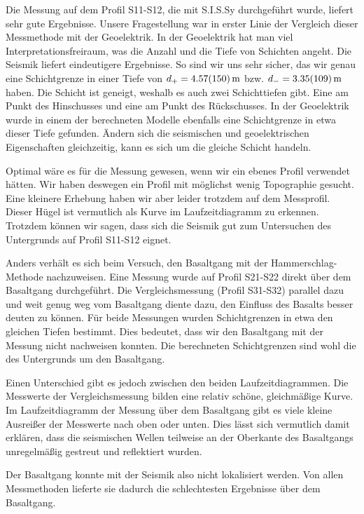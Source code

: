 \label{chap:zusfas}
Die Messung auf dem Profil S11-S12, die mit S.I.S.Sy durchgeführt wurde, liefert sehr gute Ergebnisse.
Unsere Fragestellung war in erster Linie der Vergleich dieser Messmethode mit der Geoelektrik. 
In der Geoelektrik hat man viel Interpretationsfreiraum, was die Anzahl und die Tiefe von Schichten angeht.
Die Seismik liefert eindeutigere Ergebnisse. So sind wir uns sehr sicher, das wir genau eine Schichtgrenze in einer Tiefe von $d_+= \SI{4,57 \pm 1,50}{m}$
bzw. $d_-= \SI{3,35 \pm 1,09}{m}$ haben. Die Schicht ist geneigt, weshalb es auch zwei Schichttiefen gibt. Eine am Punkt des Hinschusses und eine am Punkt des Rückschusses. In der Geoelektrik wurde in einem der berechneten Modelle ebenfalls eine Schichtgrenze in etwa dieser Tiefe gefunden. 
Ändern sich die seismischen und geoelektrischen Eigenschaften gleichzeitig, kann es sich um die gleiche Schicht handeln.

Optimal wäre es für die Messung gewesen, wenn wir ein ebenes Profil verwendet hätten. Wir haben deswegen ein Profil mit möglichst wenig Topographie gesucht.
Eine kleinere Erhebung haben wir aber leider trotzdem auf dem Messprofil. Dieser Hügel ist vermutlich als Kurve im Laufzeitdiagramm zu erkennen.
Trotzdem können wir sagen, dass sich die Seismik gut zum Untersuchen des Untergrunds auf Profil S11-S12 eignet.

Anders verhält es sich beim Versuch, den Basaltgang mit der Hammerschlag-Methode nachzuweisen. 
Eine Messung wurde auf Profil S21-S22 direkt über dem Basaltgang durchgeführt. Die Vergleichsmessung (Profil S31-S32) parallel dazu und weit genug weg vom Basaltgang diente dazu, den Einfluss des Basalts besser deuten zu können.
Für beide Messungen wurden Schichtgrenzen in etwa den gleichen Tiefen bestimmt. Dies bedeutet, dass wir den Basaltgang mit der Messung nicht nachweisen konnten. 
Die berechneten Schichtgrenzen sind wohl die des Untergrunds um den Basaltgang.

\newpage
Einen Unterschied gibt es jedoch zwischen den beiden Laufzeitdiagrammen. Die Messwerte der Vergleichsmessung bilden eine relativ schöne, gleichmäßige Kurve. 
Im Laufzeitdiagramm der Messung über dem Basaltgang gibt es viele kleine Ausreißer der Messwerte nach oben oder unten. Dies lässt sich vermutlich damit erklären,
dass die seismischen Wellen teilweise an der Oberkante des Basaltgangs unregelmäßig gestreut und reflektiert wurden.

Der Basaltgang konnte mit der Seismik also nicht lokalisiert werden. Von allen Messmethoden lieferte sie dadurch die schlechtesten Ergebnisse über dem Basaltgang.
